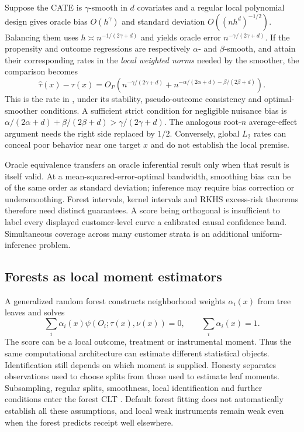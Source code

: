 Suppose the CATE is $\gamma$-smooth in $d$ covariates and a regular
local polynomial design gives oracle bias $O(h^\gamma)$ and
standard deviation $O((nh^d)^{-1/2})$. Balancing them uses
$h\asymp n^{-1/(2\gamma+d)}$ and yields oracle error
$n^{-\gamma/(2\gamma+d)}$. If the propensity and outcome regressions
are respectively $\alpha$- and $\beta$-smooth, and attain their
corresponding rates in the \emph{local weighted norms} needed by the
smoother, the comparison becomes
\begin{equation}
 \widehat\tau(x)-\tau(x)
 =O_P\left(n^{-\gamma/(2\gamma+d)}
       +n^{-\alpha/(2\alpha+d)-\beta/(2\beta+d)}\right).
 \label{r3:cate-rate}
\end{equation}
This is the rate in \citet[Corollary 1]{drlearner2023}, under its
stability, pseudo-outcome consistency and optimal-smoother conditions.
A sufficient strict condition for negligible nuisance bias is
$\alpha/(2\alpha+d)+\beta/(2\beta+d)>\gamma/(2\gamma+d)$.
The analogous root-$n$ average-effect argument needs the right side
replaced by $1/2$. Conversely, global $L_2$ rates can conceal poor
behavior near one target $x$ and do not establish the local premise.

Oracle equivalence transfers an oracle inferential result only when
that result is itself valid. At a mean-squared-error-optimal bandwidth,
smoothing bias can be of the same order as standard deviation;
inference may require bias correction or undersmoothing. Forest
intervals, kernel intervals and RKHS excess-risk theorems therefore
need distinct guarantees. A score being orthogonal is insufficient
to label every displayed customer-level curve a calibrated causal
confidence band. Simultaneous coverage across many customer strata
is an additional uniform-inference problem.

\subsection{Forests as local moment estimators}
A generalized random forest constructs neighborhood weights
$\alpha_i(x)$ from tree leaves and solves
\[
 \sum_i\alpha_i(x)\psi(O_i;\tau(x),\nu(x))=0,
 \qquad \sum_i\alpha_i(x)=1.
\]
The score can be a local outcome, treatment or instrumental moment. Thus
the same computational architecture can estimate different statistical
objects. Identification still depends on which moment is supplied.
Honesty separates observations used to choose splits from those used
to estimate leaf moments. Subsampling, regular splits, smoothness,
local identification and further conditions enter the forest CLT
\citep[Algorithm 1, Specification 1 and Theorem 5]{grf2018}. Default
forest fitting does not automatically establish all these assumptions,
and local weak instruments remain weak even when the forest predicts
receipt well elsewhere.

